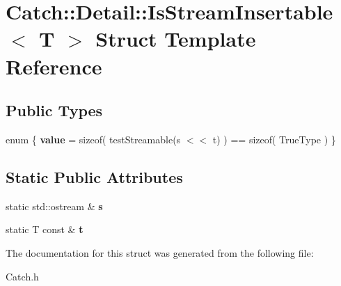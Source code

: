 \hypertarget{struct_catch_1_1_detail_1_1_is_stream_insertable}{\section{Catch\-:\-:Detail\-:\-:Is\-Stream\-Insertable$<$ T $>$ Struct Template Reference}
\label{struct_catch_1_1_detail_1_1_is_stream_insertable}
}
\subsection*{Public Types}
\begin{DoxyCompactItemize}
\item 
enum \{ {\bfseries value} = sizeof( test\-Streamable(s $<$$<$ t) ) == sizeof( True\-Type )
 \}
\end{DoxyCompactItemize}
\subsection*{Static Public Attributes}
\begin{DoxyCompactItemize}
\item 
\hypertarget{struct_catch_1_1_detail_1_1_is_stream_insertable_abe3d3c8e5d85665747faafffc9a96b00}{static std\-::ostream \& {\bfseries s}}\label{struct_catch_1_1_detail_1_1_is_stream_insertable_abe3d3c8e5d85665747faafffc9a96b00}

\item 
\hypertarget{struct_catch_1_1_detail_1_1_is_stream_insertable_a7d2a3da978b6736667a7b2f6d51f507f}{static T const \& {\bfseries t}}\label{struct_catch_1_1_detail_1_1_is_stream_insertable_a7d2a3da978b6736667a7b2f6d51f507f}

\end{DoxyCompactItemize}


The documentation for this struct was generated from the following file\-:\begin{DoxyCompactItemize}
\item 
Catch.\-h\end{DoxyCompactItemize}
